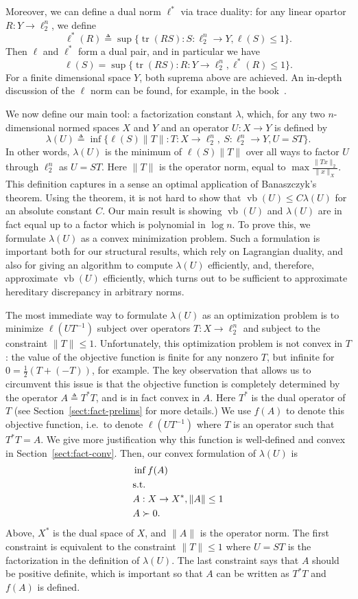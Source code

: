\documentclass[11pt]{article}
\newcommand{\eqdef}{\triangleq}
\DeclareMathOperator{\vb}{vb}
\DeclareMathOperator{\tr}{tr}
\begin{document}
Moreover, we can define a dual norm $\ell^*$ via trace duality: for
any linear opartor $R: Y \to \ell_2^n$, we define
\[
\ell^*(R) \eqdef \sup\{\tr(RS): S: \ell_2^n \to Y, \ell(S) \le 1\}.
\]
Then $\ell$ and $\ell^*$ form a dual pair, and in particular we have
\[
\ell(S) = \sup\{\tr(RS): R:Y\to\ell_2^n, \ell^*(R) \le 1\}.
\]
For a finite dimensional space $Y$, both suprema above are achieved.
An in-depth discussion of the $\ell$ norm can be found, for example,
in the book~\cite{TJ-book}.

We now define our main tool: a factorization constant $\lambda$, which, for any
two $n$-dimensional normed spaces $X$ and $Y$ and an operator $U:X \to
Y$ is defined by
\[
\lambda(U) \eqdef \inf \{\ell(S)\|T\|: T: X \to \ell_2^n,\ S: \ell_2^n
\to Y, U = ST\}.
\]
In other words, $\lambda(U)$ is the minimum of $\ell(S)\|T\|$ over all
ways to factor $U$ through $\ell_2^n$ as $U = ST$. Here $\|T\|$ is the
operator norm, equal to $\max \frac{\|Tx\|_2}{\|x\|_X}$. 
This definition
captures in a sense an optimal application of Banaszczyk's
theorem. Using the theorem, it is not hard to show that $\vb(U) \le
C\lambda(U)$ for an absolute constant $C$. Our main result is showing
$\vb(U)$ and $\lambda(U)$ are in fact equal up to a factor which is
polynomial in $\log n$. To prove this, we formulate $\lambda(U)$ as a
convex minimization problem. Such a formulation is important both for
our structural results, which rely on Lagrangian duality, and also for
giving an algorithm to compute $\lambda(U)$ efficiently, and,
therefore, approximate $\vb(U)$ efficiently, which turns out to be
sufficient to approximate hereditary discrepancy in arbitrary norms.

The most immediate way to formulate $\lambda(U)$ as an optimization
problem is to minimize $\ell(UT^{-1})$ subject over operators $T:X \to
\ell_2^n$ and subject to the constraint $\|T\|\le 1$.
Unfortunately, this optimization problem is not convex in $T$: the
value of the objective function is finite for any nonzero $T$, but
infinite for $0 = \frac12(T + (-T))$, for example. The key observation
that allows us to circumvent this issue is that the objective function
is completely determined by the operator $A \eqdef T^*T$, and is in
fact convex in $A$. Here $T^*$ is the dual operator of $T$ (see
Section~\ref{sect:fact-prelims} for more details.) We use $f(A)$ to
denote this objective function, i.e.~to denote $\ell(UT^{-1})$ where
$T$ is an operator such that $T^*T = A$. We give more justification
why this function is well-defined and convex in
Section~\ref{sect:fact-conv}. Then, our convex formulation of
$\lambda(U)$ is
\begin{align*}
  &\inf  f(A) \\
  &\text{s.t.}\notag\\
  &A: X \to X^*,\|A\| \le 1\\
  &A \succ 0.
\end{align*}
Above, $X^*$ is the dual space of $X$, and $\|A\|$ is the operator
norm. The first constraint is equivalent to the constraint $\|T\|\le
1$ where $U = ST$ is the factorization in the definition of
$\lambda(U)$. The last constraint says that $A$ should be positive
definite, which is important so that $A$ can be written as $T^*T$ and
$f(A)$ is defined. 
\end{document}
